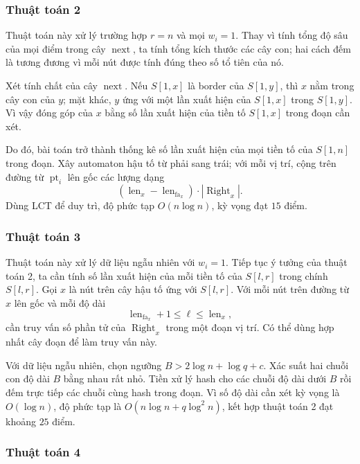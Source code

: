 \documentclass[11pt]{article}
\begin{document}
\subsubsection{Thuật toán 2}

Thuật toán này xử lý trường hợp $r=n$ và mọi $w_i=1$. Thay vì tính tổng độ sâu
của mọi điểm trong cây \(\operatorname{next}\), ta tính tổng kích thước các cây
con; hai cách đếm là tương đương vì mỗi nút được tính đúng theo số tổ tiên của
nó.

Xét tính chất của cây \(\operatorname{next}\). Nếu $S[1,x]$ là border của
$S[1,y]$, thì $x$ nằm trong cây con của $y$; mặt khác, $y$ ứng với một lần xuất
hiện của $S[1,x]$ trong $S[1,y]$. Vì vậy đóng góp của $x$ bằng số lần xuất hiện
của tiền tố $S[1,x]$ trong đoạn cần xét.

Do đó, bài toán trở thành thống kê số lần xuất hiện của mọi tiền tố của $S[1,n]$
trong đoạn. Xây automaton hậu tố từ phải sang trái; với mỗi vị trí, cộng trên
đường từ $\operatorname{pt}_i$ lên gốc các lượng dạng
\[
  (\operatorname{len}_x-\operatorname{len}_{\operatorname{fa}_x})
  \cdot |\operatorname{Right}_x|.
\]
Dùng LCT để duy trì, độ phức tạp $O(n\log n)$, kỳ vọng đạt $15$ điểm.

\subsubsection{Thuật toán 3}

Thuật toán này xử lý dữ liệu ngẫu nhiên với $w_i=1$. Tiếp tục ý tưởng của thuật
toán 2, ta cần tính số lần xuất hiện của mỗi tiền tố của $S[l,r]$ trong chính
$S[l,r]$. Gọi $x$ là nút trên cây hậu tố ứng với $S[l,r]$. Với mỗi nút trên đường
từ $x$ lên gốc và mỗi độ dài
\[
  \operatorname{len}_{\operatorname{fa}_x}+1
  \le \ell \le
  \operatorname{len}_x,
\]
cần truy vấn số phần tử của $\operatorname{Right}_x$ trong một đoạn vị trí. Có
thể dùng hợp nhất cây đoạn để làm truy vấn này.

Với dữ liệu ngẫu nhiên, chọn ngưỡng $B>2\log n+\log q+c$. Xác suất hai chuỗi con
độ dài $B$ bằng nhau rất nhỏ. Tiền xử lý hash cho các chuỗi độ dài dưới $B$ rồi
đếm trực tiếp các chuỗi cùng hash trong đoạn. Vì số độ dài cần xét kỳ vọng là
$O(\log n)$, độ phức tạp là $O(n\log n+q\log^2 n)$, kết hợp thuật toán 2 đạt
khoảng $25$ điểm.

\subsubsection{Thuật toán 4}
\end{document}
